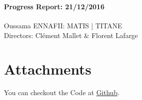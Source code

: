 \documentclass[a4paper, 11pt]{article}
\begin{document}
	\begin{centering}
		\large\textbf{Progress Report: 21/12/2016}\\
		~\\
		Oussama ENNAFII:
		\normalsize MATIS | TITANE \\
		Directors: Cl\'ement Mallet \& Florent Lafarge \\
	\end{centering}


\section*{}

\section*{Attachments}

You can checkout the Code at \href{https://github.com/Ethiy/3DSceneModel}{Github}.



\end{document}
